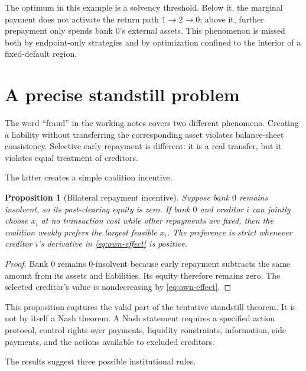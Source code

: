 \documentclass[11pt]{article}
\newtheorem{proposition}[theorem]{Proposition}
\theoremstyle{definition}
\theoremstyle{remark}
\begin{document}
The optimum in this example is a solvency threshold.  Below it, the marginal
payment does not activate the return path $1\to2\to0$; above it, further
prepayment only spends bank $0$'s external assets.  This phenomenon is missed
both by endpoint-only strategies and by optimization confined to the interior
of a fixed-default region.

\section{A precise standstill problem}

The word ``fraud'' in the working notes covers two different phenomena.
Creating a liability without transferring the corresponding asset violates
balance-sheet consistency.  Selective early repayment is different: it is a
real transfer, but it violates equal treatment of creditors.

The latter creates a simple coalition incentive.

\begin{proposition}[Bilateral repayment incentive]
Suppose bank $0$ remains insolvent, so its post-clearing equity is zero.  If
bank $0$ and creditor $i$ can jointly choose $x_i$ at no transaction cost while
other repayments are fixed, then the coalition weakly prefers the largest
feasible $x_i$.  The preference is strict whenever creditor $i$'s derivative
in \eqref{eq:own-effect} is positive.
\end{proposition}

\begin{proof}
Bank $0$ remains 0-insolvent because early repayment subtracts the same amount
from its assets and liabilities.  Its equity therefore remains zero.  The
selected creditor's value is nondecreasing by
\eqref{eq:own-effect}.
\end{proof}

This proposition captures the valid part of the tentative standstill theorem.
It is not by itself a Nash theorem.  A Nash statement requires a specified
action protocol, control rights over payments, liquidity constraints,
information, side payments, and the actions available to excluded creditors.

The results suggest three possible institutional rules.
\end{document}
